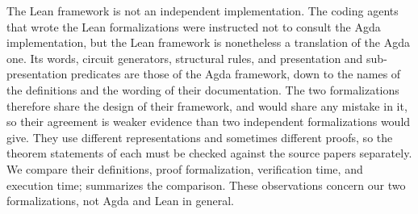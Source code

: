 \documentclass[acmsmall,screen,nonacm]{acmart}
\begin{document}
The Lean framework is not an independent implementation. The coding agents that wrote the Lean formalizations were instructed not to consult the Agda implementation, but the Lean framework is nonetheless a translation of the Agda one. Its words, circuit generators, structural rules, and presentation and sub-presentation predicates are those of the Agda framework, down to the names of the definitions and the wording of their documentation. The two formalizations therefore share the design of their framework, and would share any mistake in it, so their agreement is weaker evidence than two independent formalizations would give. They use different representations and sometimes different proofs, so the theorem statements of each must be checked against the source papers separately. We compare their definitions, proof formalization, verification time, and execution time;  summarizes the comparison. These observations concern our two formalizations, not Agda and Lean in general.
\end{document}
